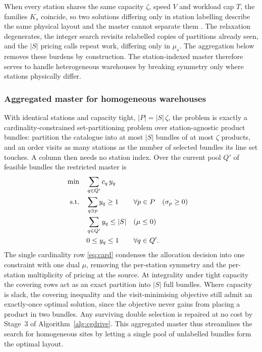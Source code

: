 \documentclass[]{interact}
\begin{document}
When every station shares the same capacity $\zeta$, speed $V$ and workload cap $T$, the families $K_s$ coincide, so two solutions differing only in station labelling describe the same physical layout and the master cannot separate them \citep{vanderbeck2000dw}. The relaxation degenerates, the integer search revisits relabelled copies of partitions already seen, and the $|S|$ pricing calls repeat work, differing only in $\mu_s$. The aggregation below removes these burdens by construction. The station-indexed master therefore serves to handle heterogeneous warehouses by breaking symmetry only where stations physically differ.

\subsubsection{Aggregated master for homogeneous warehouses}\label{sec:cgagg}
With identical stations and capacity tight, $|P| = |S|\,\zeta$, the problem is exactly a cardinality-constrained set-partitioning problem over station-agnostic product bundles: partition the catalogue into at most $|S|$ bundles of at most $\zeta$ products, and an order visits as many stations as the number of selected bundles its line set touches. A column then needs no station index. Over the current pool $Q'$ of feasible bundles the restricted master is
\begin{align}
\min \quad & \sum_{q \in Q'} c_q\, y_q \notag\\
\text{s.t.} \quad
& \sum_{q \ni p} y_q \ge 1 && \forall p \in P \quad (\sigma_p \ge 0) \label{eq:cover}\\
& \sum_{q \in Q'} y_q \le |S| && (\mu \le 0) \label{eq:card}\\
& 0 \le y_q \le 1 && \forall q \in Q'. \notag
\end{align}
The single cardinality row \eqref{eq:card} condenses the allocation decision into one constraint with one dual $\mu$, removing the per-station symmetry and the per-station multiplicity of pricing at the source. At integrality under tight capacity the covering rows act as an exact partition into $|S|$ full bundles. Where capacity is slack, the covering inequality and the visit-minimising objective still admit an exactly-once optimal solution, since the objective never gains from placing a product in two bundles. Any surviving double selection is repaired at no cost by Stage~3 of Algorithm~\ref{alg:cgdrive}. This aggregated master thus streamlines the search for homogeneous sites by letting a single pool of unlabelled bundles form the optimal layout.
\end{document}
